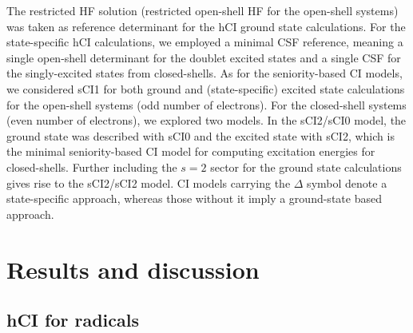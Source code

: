 \documentclass[aip,jcp,reprint,noshowkeys,superscriptaddress]{revtex4-1}
\begin{document}
The restricted HF solution (restricted open-shell HF for the open-shell systems) was taken as reference determinant for the hCI ground state calculations.
For the state-specific hCI calculations, we employed a minimal CSF reference, \cite{Kossoski_2023}
meaning a single open-shell determinant for the doublet excited states and a single CSF for the singly-excited states from closed-shells.
As for the seniority-based CI models, 
we considered sCI1 for both ground and (state-specific) excited state calculations for the open-shell systems (odd number of electrons).
For the closed-shell systems (even number of electrons), we explored two models.
In the sCI2/sCI0 model, the ground state was described with sCI0 and the excited state with sCI2, which is the minimal seniority-based CI model for computing excitation energies for closed-shells.
Further including the $s=2$ sector for the ground state calculations gives rise to the sCI2/sCI2 model.
CI models carrying the $\Delta$ symbol denote a state-specific approach, whereas those without it imply a ground-state based approach.


\section{Results and discussion}
\label{sec:res}


\subsection{hCI for radicals}
\label{sec:res_A}

\end{document}

